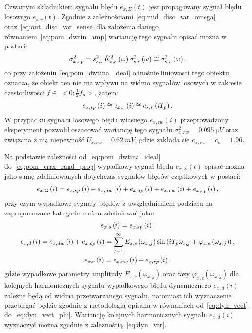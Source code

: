 Czwartym składnikiem sygnału błędu $e_{x,\Sigma}(t)$ jest propagowany sygnał błędu losowego $e_{s,r}(t)$. Zgodnie z zależnościami~\eqref{eq:mid_disc_var_omega} oraz~\eqref{eq:out_disc_var_sense} dla założenia danego równaniem~\eqref{eq:pom_dwtin_amp} wariancję tego sygnału opisać można w postaci:
\begin{equation}
\sigma_{x,rp}^{2} = s_{s,x}^{2} \tilde{K}_{s,x}^{2} \left(\omega\right) \sigma_{s,r}^{2} \left(\omega\right) \cong \sigma_{s,r}^{2} \left(\omega\right) \label{eq:pom_varx_rand_prop},
\end{equation}
co przy założeniu~\eqref{eq:pom_dwtina_ideal} odnośnie liniowości tego obiektu oznacza, że obiekt ten nie ma wpływu na widmo sygnałów losowych w zakresie częstotliwości $f \in~<0; \frac{1}{2} f_{p}>$, zatem:
\begin{equation}
e_{x,rp} \left(i\right) \cong e_{x,r} \left(i\right) \cong e_{s,r} \left(i T_{p}\right) \label{eq:pom_errx_rand_prop}.
\end{equation}
W przypadku sygnału losowego błędu własnego $e_{x,rw}(i)$ przeprowadzony eksperyment pozwolił oszacować wariancję tego sygnału $\sigma_{x,rw}^{2} = \qty{0.095}{\micro V}$ oraz związaną z nią niepewność $U_{x,rw} = \qty{0.62}{mV}$, gdzie zakłada się $c_{x,rw} = c_{n} = 1.96$.

Na podstawie zależności od~\eqref{eq:pom_dwtina_ideal} do~\eqref{eq:pom_errx_rand_prop} wypadkowy sygnał błędu $e_{x,\Sigma}(t)$ opisać można jako sumę zdefiniowanych dotychczas sygnałów błędów cząstkowych w postaci:
\begin{equation}
e_{x,\Sigma} \left(i\right) = e_{x,sp} \left(i\right) + e_{x,dw} \left(i\right) + e_{x,dp} \left(i\right) + e_{x,rw} \left(i\right) + e_{x,rp} \left(i\right) \label{eq:pom_errx_sum},
\end{equation}
przy czym wypadkowe sygnały błędów z uwzględnieniem podziału na zaproponowane kategorie można zdefiniować jako:
\begin{gather}
e_{x,s} \left(i\right) = e_{x,sp} \left(i\right) \label{eq:pom_errx_stat}, \\
e_{x,d} \left(i\right) = e_{x,dw} \left(i\right) + e_{x,dp} \left(i\right) = \sum _{j=1} ^{\infty} E_{x,e} \left(\omega_{x,j}\right) \sin \left(i T_{p} \omega_{x,j} + \varphi_{x,e} \left(\omega_{x,j}\right)\right) \label{eq:pom_errx_dyn}, \\
e_{x,r} \left(i\right) = e_{x,rw} \left(i\right) + e_{x,rp} \left(i\right) \label{eq:pom_errx_rand},
\end{gather}
gdzie wypadkowe parametry amplitudy $E_{x,e}(\omega_{x,j})$ oraz fazy $\varphi_{x,e}(\omega_{x,j})$ dla kolejnych harmonicznych sygnału wypadkowego błędu dynamicznego $e_{x,d}(i)$ zależne będą od widma przetwarzanego sygnału, natomiast ich wyznaczenie przebiegać będzie zgodnie z metodologią opisaną w równaniach od~\eqref{eq:dyn_vect} do~\eqref{eq:dyn_vect_phi}. Wariancję kolejnych harmonicznych sygnału $e_{x,d}(i)$ wyznaczyć można zgodnie z zależnością~\eqref{eq:dyn_var}.

